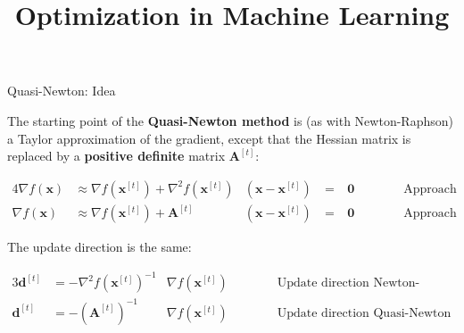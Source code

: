 \documentclass[11pt,compress,t,notes=noshow, xcolor=table]{beamer}
\title{Optimization in Machine Learning}
\date{}
\begin{document}
\sloppy

\begin{vbframe}{Quasi-Newton: Idea}



The starting point of the \textbf{Quasi-Newton method} is (as with Newton-Raphson) a Taylor approximation of the gradient, except that the Hessian matrix is replaced by a \textbf{positive definite} matrix $\bm{A}^{[t]}$:

\vspace*{-0.2cm}
\begin{footnotesize}
\begin{alignat*}{4}
\nabla f(\mathbf{x}) &\approx  \nabla f(\mathbf{x}^{[t]}) + \nabla^2 f(\mathbf{x}^{[t]}) & (\mathbf{x} - \mathbf{x}^{[t]}) ~ &=& ~\mathbf{0}  &\qquad& \text{ Approach Newton-Raphson} \\
\nabla f(\mathbf{x}) &\approx \nabla f(\mathbf{x}^{[t]}) + \bm{A}^{[t]} & (\mathbf{x} - \mathbf{x}^{[t]}) ~ &=& ~ \mathbf{0} &\qquad& \text{ Approach Quasi-Newton}
\end{alignat*}
\end{footnotesize}

The update direction is the same:

\begin{footnotesize}
\begin{alignat*}{3}
\bm{d}^{[t]} &= - \nabla^2 f(\mathbf{x}^{[t]})^{-1} & \nabla f(\mathbf{x}^{[t]}) &\qquad& \text{ Update direction Newton-Raphson} \\
\bm{d}^{[t]} &= - (\bm{A}^{[t]})^{-1} & \nabla f(\mathbf{x}^{[t]}) &\qquad& \text{ Update direction Quasi-Newton} \\
\end{alignat*}
\end{footnotesize}


\end{vbframe}
\end{document}
